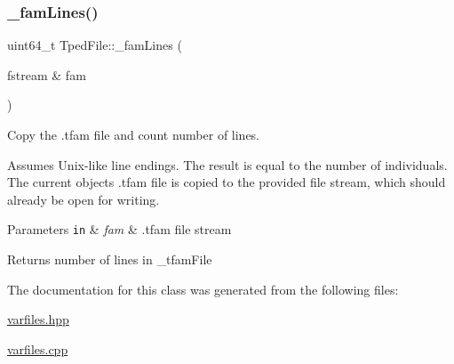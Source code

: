 \subsubsection{\texorpdfstring{\+\_\+fam\+Lines()}{\_famLines()}\hspace{0.1cm}{\footnotesize\ttfamily [2/2]}}
{\footnotesize\ttfamily uint64\+\_\+t Tped\+File\+::\+\_\+fam\+Lines (\begin{DoxyParamCaption}\item[{fstream \&}]{fam }\end{DoxyParamCaption})\hspace{0.3cm}{\ttfamily [protected]}}



Copy the .tfam file and count number of lines. 

Assumes Unix-\/like line endings. The result is equal to the number of individuals. The current object\textquotesingle{}s .tfam file is copied to the provided file stream, which should already be open for writing.


\begin{DoxyParams}[1]{Parameters}
\mbox{\tt in}  & {\em fam} & .tfam file stream\\
\hline
\end{DoxyParams}
\begin{DoxyReturn}{Returns}
number of lines in {\ttfamily \+\_\+tfam\+File} 
\end{DoxyReturn}


The documentation for this class was generated from the following files\+:\begin{DoxyCompactItemize}
\item 
\hyperlink{varfiles_8hpp}{varfiles.\+hpp}\item 
\hyperlink{varfiles_8cpp}{varfiles.\+cpp}\end{DoxyCompactItemize}
